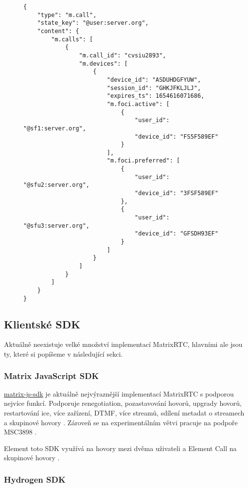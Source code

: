 
\begin{figure}[H]
    \begin{verbatim}
{
	"type": "m.call",
	"state_key": "@user:server.org",
	"content": {
		"m.calls": [
			{
				"m.call_id": "cvsiu2893",
				"m.devices": [
					{
						"device_id": "ASDUHDGFYUW",
						"session_id": "GHKJFKLJLJ",
						"expires_ts": 1654616071686,
						"m.foci.active": [
							{ 
								"user_id": "@sf1:server.org", 
								"device_id": "FS5F589EF" 
							}
						],
						"m.foci.preferred": [
							{ 
								"user_id": "@sfu2:server.org", 
								"device_id": "3FSF589EF" 
							},
							{ 
								"user_id": "@sfu3:server.org", 
								"device_id": "GFSDH93EF" 
							}
						]	
					}
				]
			}
		]
	}
}
	\end{verbatim}
\end{figure}

\subsection{Klientské SDK}

Aktuálně neexistuje velké množství implementací MatrixRTC, hlavními ale jsou ty,
které si popíšeme v následující sekci.

\subsubsection{Matrix JavaScript SDK}\label{matrix-js-sdk}

\href{https://github.com/matrix-org/matrix-js-sdk/}{matrix-js-sdk} je aktuálně
nejvýraznější implementací MatrixRTC s podporou nejvíce funkcí. Podporuje
renegotiation, pozastavování hovorů, upgrady hovorů, restartování \gls{ice},
více zařízení, DTMF, více streamů, sdílení metadat o streamech a skupinové
hovory \parencite{GitHub-MatrixJSSDK}. Zároveň se na experimentálním větvi
pracuje na podpoře MSC3898 \parencite{GitHub-MatrixJSSDK-MSC3898}.

Element toto SDK využívá na hovory mezi dvěma uživateli a Element Call na
skupinové hovory
\parencite{GitHub-ElementCall,GitHub-ElementWeb,GitHub-MatrixReactSDK}.

\subsubsection{Hydrogen SDK}


